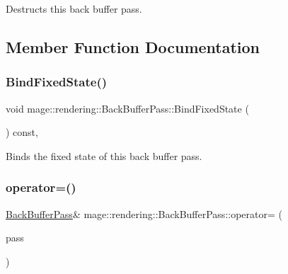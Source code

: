 Destructs this back buffer pass. 

\subsection{Member Function Documentation}
\hypertarget{classmage_1_1rendering_1_1_back_buffer_pass_a45aafe0681a6e0598d088dbf3954cfb7}{}\label{classmage_1_1rendering_1_1_back_buffer_pass_a45aafe0681a6e0598d088dbf3954cfb7} 
\subsubsection{\texorpdfstring{Bind\+Fixed\+State()}{BindFixedState()}}
{\footnotesize\ttfamily void mage\+::rendering\+::\+Back\+Buffer\+Pass\+::\+Bind\+Fixed\+State (\begin{DoxyParamCaption}{ }\end{DoxyParamCaption}) const\hspace{0.3cm}{\ttfamily [private]}, {\ttfamily [noexcept]}}

Binds the fixed state of this back buffer pass. \hypertarget{classmage_1_1rendering_1_1_back_buffer_pass_acad71e5633ba37b1069c5a2ef9e6f704}{}\label{classmage_1_1rendering_1_1_back_buffer_pass_acad71e5633ba37b1069c5a2ef9e6f704} 
\subsubsection{\texorpdfstring{operator=()}{operator=()}\hspace{0.1cm}{\footnotesize\ttfamily [1/2]}}
{\footnotesize\ttfamily \hyperlink{classmage_1_1rendering_1_1_back_buffer_pass}{Back\+Buffer\+Pass}\& mage\+::rendering\+::\+Back\+Buffer\+Pass\+::operator= (\begin{DoxyParamCaption}\item[{const \hyperlink{classmage_1_1rendering_1_1_back_buffer_pass}{Back\+Buffer\+Pass} \&}]{pass }\end{DoxyParamCaption})\hspace{0.3cm}{\ttfamily [delete]}}

